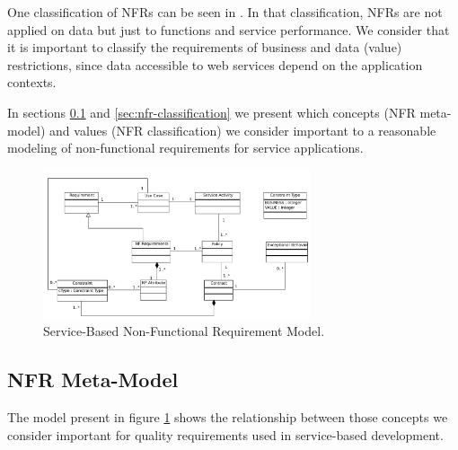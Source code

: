 \documentclass{sig-alternate}
\begin{document}
One classification of NFRs can be seen in \cite{Yeom2006}.
In that classification, NFRs are not applied on data but just to functions and
 service performance. 
We consider that it is important to classify the
 requirements of business and data (value) restrictions, since data accessible to web
 services depend on the application contexts.
  
 In sections \ref{sec:nfr-metamodel} and \ref{sec:nfr-classification} we present
 which concepts (NFR meta-model) and values (NFR classification) we consider
 important to a reasonable modeling of non-functional requirements for service
 applications.
 
 

\begin{figure}[ht!]  
\centering  
\includegraphics[width=0.70\textwidth]{figs/contractModel.pdf}
\caption{Service-Based Non-Functional Requirement Model.}
\label{fig:NRFmodel} 
\end{figure} 

 \subsection{NFR Meta-Model} 
\label{sec:nfr-metamodel}



The model present in figure \ref{fig:NRFmodel} shows the relationship between
those concepts
we consider important for quality requirements used
in service-based development.

\end{document}
